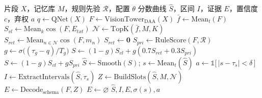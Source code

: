 \begin{algorithm}[t]
\caption{\evivad{} 的训练与前向流程}
\label{alg:evivad}
\begin{algorithmic}[1]
\REQUIRE 片段 $X$，记忆库 $M$，规则先验 $\mathcal{R}$，配置 $\theta$
\ENSURE 分数曲线 $\hat{S}$，区间 $I$，证据 $E$，置信度 $c$，弃权 $a$
\STATE $q \leftarrow \mathrm{QNet}(X)$ 
\STATE $F \leftarrow \mathrm{VisionTower}_{\mathrm{DAA}}(X)$ 
\STATE $\bar{f} \leftarrow \mathrm{Mean}_t(F)$
\STATE $S_{vl} \leftarrow \mathrm{Mean}_k \cos(F, E_{txt})$
\STATE $\mathcal{N} \leftarrow \mathrm{TopK}(\bar{f}, M, K)$
    \STATE $S_{ret} \leftarrow \mathrm{Mean}_{n \in \mathcal{N}} \cos(F, m_n)$
\ELSE
    \STATE $S_{ret} \leftarrow \mathbf{0}$ 
\ENDIF
\STATE $S_{pri} \leftarrow \mathrm{RuleScore}(F, \mathcal{R})$
\STATE $g \leftarrow \sigma\big((\tau_g - q)/T_g\big)$
    \STATE $S \leftarrow (1-g) S_{vl} + g (0.7 S_{ret} + 0.3 S_{pri})$
\ELSE
    \STATE $S \leftarrow (1-g) S_{vl} + g S_{pri}$
\ENDIF
\STATE $\hat{S} \leftarrow \mathrm{Smooth}(S)$; \quad $s \leftarrow \mathrm{Mean}_t(\hat{S})$
\STATE $a \leftarrow \mathbb{1}\big[\,|s - \tau_s| < \delta\,\big]$
\STATE $I \leftarrow \mathrm{ExtractIntervals}(\hat{S}, \tau_s)$
\STATE $Z \leftarrow \mathrm{BuildSlots}(\hat{S}, M, \mathcal{N})$
\STATE $E \leftarrow \mathrm{Decode}_{\mathrm{schema}}(F, Z)$
    \STATE $E \leftarrow \varnothing$ 
\ENDIF
\RETURN $\hat{S}, I, E, \sigma(s), a$
\end{algorithmic}
\end{algorithm}
